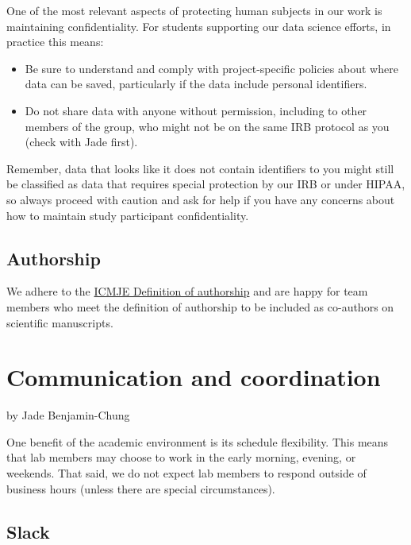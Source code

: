 \documentclass[
]{book}
\providecommand{\tightlist}{%
  \setlength{\itemsep}{0pt}\setlength{\parskip}{0pt}}
\begin{document}
One of the most relevant aspects of protecting human subjects in our work is maintaining confidentiality. For students supporting our data science efforts, in practice this means:

\begin{itemize}
\tightlist
\item
  Be sure to understand and comply with project-specific policies about where data can be saved, particularly if the data include personal identifiers.
\item
  Do not share data with anyone without permission, including to other members of the group, who might not be on the same IRB protocol as you (check with Jade first).
\end{itemize}

Remember, data that looks like it does not contain identifiers to you might still be classified as data that requires special protection by our IRB or under HIPAA, so always proceed with caution and ask for help if you have any concerns about how to maintain study participant confidentiality.

\hypertarget{authorship}{%
\section{Authorship}\label{authorship}}

We adhere to the \href{http://www.icmje.org/recommendations/browse/roles-and-responsibilities/defining-the-role-of-authors-and-contributors.html}{ICMJE Definition of authorship} and are happy for team members who meet the definition of authorship to be included as co-authors on scientific manuscripts.

\hypertarget{communication-and-coordination}{%
\chapter{Communication and coordination}\label{communication-and-coordination}}

by Jade Benjamin-Chung

One benefit of the academic environment is its schedule flexibility. This means that lab members may choose to work in the early morning, evening, or weekends. That said, we do not expect lab members to respond outside of business hours (unless there are special circumstances).

\hypertarget{slack}{%
\section{Slack}\label{slack}}
\end{document}
